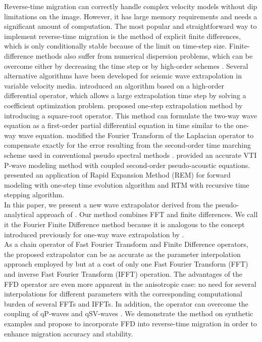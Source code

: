 Reverse-time migration can correctly handle complex velocity models
without dip limitations on the image.  
However, it has large memory requirements and needs a significant amount of computation. 
The most popular and straightforward way to implement reverse-time migration is 
the method of explicit finite differences, 
which is only conditionally stable because of the limit on time-step size. 
Finite-difference methods also suffer from numerical dispersion problems, 
which can be overcome either by decreasing the time step or by high-order schemes \cite[]{Wu,liu}. 
Several alternative algorithms have been developed for seismic wave extrapolation in variable velocity media.  
\cite{yu} introduced an algorithm based on a high-order differential operator, 
which allows a large extrapolation time step by solving a coefficient optimization problem.
\cite{zhang} proposed one-step extrapolation method by introducing a square-root operator. This method can formulate the two-way wave equation as a first-order partial differential equation in time similar to the one-way wave equation.
\cite{etgen} modified the Fourier Transform of the Laplacian operator to compensate exactly for the error
resulting from the second-order time marching scheme used in conventional pseudo spectral methods \cite[]{pseudo}.
\cite{fowler} provided an accurate VTI P-wave modeling method with coupled second-order pseudo-acoustic equations.
\cite{pestana} presented an application of Rapid Expansion Method (REM) \cite[]{tal} for forward modeling with one-step time evolution algorithm and RTM with recursive time stepping algorithm.\\

In this paper, we present a new wave extrapolator derived from the pseudo-analytical approach of \cite{etgen}.
Our method combines FFT and finite differences. 
We call it the Fourier Finite Difference method 
because it is analogous to the concept introduced previously for one-way wave extrapolation by \cite{ffd}.\\ 

As a chain operator of Fast Fourier Transform and Finite Difference operators, 
the proposed extrapolator can be as accurate as the parameter interpolation approach employed by \cite{etgen}
but at a cost of only one Fast Fourier Transform (FFT) and inverse Fast Fourier Transform (IFFT) operation.
The advantages of the FFD operator are even more apparent in the anisotropic case: 
no need for several interpolations for different parameters with 
the corresponding computational burden of several FFTs and IFFTs. 
In addition, the operator can overcome the coupling of qP-waves and qSV-waves \cite[]{zhang2}. 
We demonstrate the method on synthetic examples and propose to incorporate FFD into reverse-time migration in order to enhance migration accuracy and stability.


